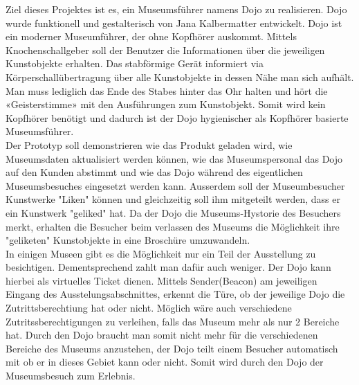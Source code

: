 Ziel dieses Projektes ist es, ein Museumsführer namens Dojo zu realisieren. Dojo wurde funktionell und gestalterisch von Jana Kalbermatter entwickelt. Dojo ist ein moderner Museumführer, der ohne Kopfhörer auskommt. Mittels Knochenschallgeber soll der Benutzer die Informationen über die jeweiligen Kunstobjekte erhalten. Das stabförmige Gerät informiert via Körperschallübertragung über alle Kunstobjekte in dessen Nähe man sich aufhält. Man muss lediglich das Ende des Stabes hinter das Ohr halten und hört die «Geisterstimme» mit den Ausführungen zum Kunstobjekt. Somit wird kein Kopfhörer benötigt und dadurch ist der Dojo hygienischer als Kopfhörer basierte Museumsführer.\\
Der Prototyp soll demonstrieren wie das Produkt geladen wird, wie Museumsdaten aktualisiert werden können, wie das Museumspersonal das Dojo auf den Kunden abstimmt und wie das Dojo während des eigentlichen Museumsbesuches eingesetzt werden kann. Ausserdem soll der Museumbesucher Kunstwerke "Liken" können und gleichzeitig soll ihm mitgeteilt werden, dass er ein Kunstwerk "geliked" hat. Da der Dojo die Museums-Hystorie des Besuchers merkt, erhalten die Besucher beim verlassen des Museums die Möglichkeit ihre "geliketen" Kunstobjekte in eine Broschüre umzuwandeln. \\
In einigen Museen gibt es die Möglichkeit nur ein Teil der Ausstellung zu besichtigen. Dementsprechend zahlt man dafür auch weniger. Der Dojo kann hierbei als virtuelles Ticket dienen. Mittels Sender(Beacon) am jeweiligen Eingang des Ausstelungsabschnittes, erkennt die Türe, ob der jeweilige Dojo die Zutrittsberechtiung hat oder nicht. Möglich wäre auch verschiedene Zutritssberechtigungen zu verleihen, falls das Museum mehr als nur 2 Bereiche hat.
Durch den Dojo braucht man somit nicht mehr für die verschiedenen Bereiche des Museums anzustehen, der  Dojo teilt einem Besucher automatisch mit ob er in dieses Gebiet kann oder nicht.
Somit wird durch den Dojo der Museumsbesuch zum Erlebnis.